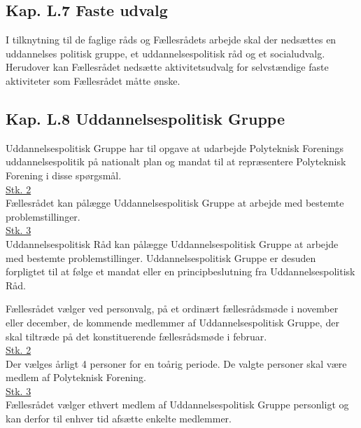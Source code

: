 \begin{list}
\subsection*{Kap. L.7 Faste udvalg}
\item I tilknytning til de faglige råds og Fællesrådets arbejde skal der nedsættes en uddannelses politisk gruppe, et uddannelsespolitisk råd og et socialudvalg. Herudover kan Fællesrådet nedsætte aktivitetsudvalg for selvstændige faste aktiviteter som Fællesrådet måtte ønske.\\

\subsection*{Kap. L.8 Uddannelsespolitisk Gruppe}
\item Uddannelsespolitisk Gruppe har til opgave at udarbejde Polyteknisk Forenings uddannelsespolitik på nationalt plan og mandat til at repræsentere Polyteknisk Forening i disse spørgsmål.\\

\underline{Stk. 2}\\
Fællesrådet kan pålægge Uddannelsespolitisk Gruppe at arbejde med bestemte problemstillinger.\\

\underline{Stk. 3}\\
Uddannelsespolitisk Råd kan pålægge Uddannelsespolitisk Gruppe at arbejde med bestemte problemstillinger. Uddannelsespolitisk Gruppe er desuden forpligtet til at følge et mandat eller en
principbeslutning fra Uddannelsespolitisk Råd.\\

\item Fællesrådet vælger ved personvalg, på et ordinært fællesrådsmøde i november eller december, de kommende medlemmer af Uddannelsespolitisk Gruppe, der skal tiltræde på det konstituerende fællesrådsmøde i februar.\\

\underline{Stk. 2}\\
Der vælges årligt 4 personer for en toårig periode. De valgte personer skal være medlem af Polyteknisk Forening.\\

\underline{Stk. 3}\\ Fællesrådet vælger ethvert medlem af Uddannelsespolitisk Gruppe personligt og kan derfor til enhver tid afsætte enkelte medlemmer.\\


\end{list}
